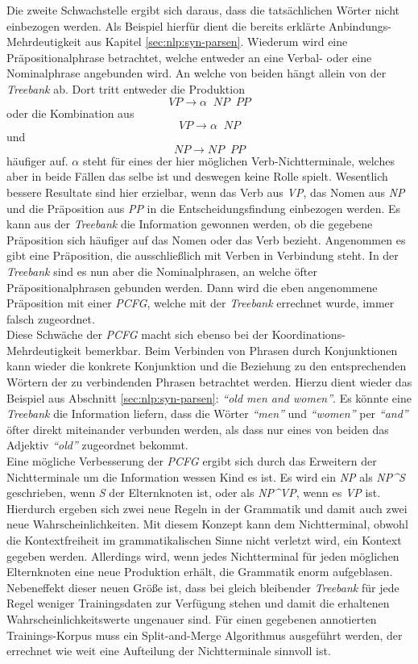 Die zweite Schwachstelle ergibt sich daraus, dass die tatsächlichen Wörter nicht einbezogen werden. Als Beispiel hierfür dient die bereits erklärte Anbindungs-Mehrdeutigkeit aus Kapitel \ref{sec:nlp:syn-parsen}. Wiederum wird eine Präpositionalphrase betrachtet, welche entweder an eine Verbal- oder eine Nominalphrase angebunden wird. An welche von beiden hängt allein von der \textit{Treebank} ab. Dort tritt entweder die Produktion \[ VP  \to  \alpha \;\;  NP \;\; PP \] oder die Kombination aus \[ VP  \to  \alpha \;\; NP \] und \[ NP  \to  NP \;\; PP \] häufiger auf. \( \alpha \) steht für eines der hier möglichen Verb-Nichtterminale, welches aber in beide Fällen das selbe ist und deswegen keine Rolle spielt. Wesentlich bessere Resultate sind hier erzielbar, wenn das Verb aus \textit{VP}, das Nomen aus \textit{NP} und die Präposition aus \textit{PP} in die Entscheidungsfindung einbezogen werden. Es kann aus der \textit{Treebank} die Information gewonnen werden, ob die gegebene Präposition sich häufiger auf das Nomen oder das Verb bezieht. Angenommen es gibt eine Präposition, die ausschließlich mit Verben in Verbindung steht. In der \textit{Treebank} sind es nun aber die Nominalphrasen, an welche öfter Präpositionalphrasen gebunden werden. Dann wird die eben angenommene Präposition mit einer \textit{PCFG}, welche mit der \textit{Treebank} errechnet wurde, immer falsch zugeordnet. \\ 
Diese Schwäche der \textit{PCFG} macht sich ebenso bei der Koordinations-Mehrdeutigkeit bemerkbar. Beim Verbinden von Phrasen durch Konjunktionen kann wieder die konkrete Konjunktion und die Beziehung zu den entsprechenden Wörtern der zu verbindenden Phrasen betrachtet werden. Hierzu dient wieder das Beispiel aus Abschnitt \ref{sec:nlp:syn-parsen}: \textit{``old men and women''}. Es könnte eine \textit{Treebank} die Information liefern, dass die Wörter \textit{``men''} und \textit{``women''} per \textit{``and''} öfter direkt miteinander verbunden werden, als dass nur eines von beiden das Adjektiv \textit{``old''} zugeordnet bekommt. \\
Eine mögliche Verbesserung der \textit{PCFG} ergibt sich durch das Erweitern der Nichtterminale um die Information wessen Kind es ist. Es wird ein \textit{NP} als \textit{NP\^{}S} geschrieben, wenn \textit{S} der Elternknoten ist, oder als \textit{NP\^{}VP}, wenn es \textit{VP} ist. Hierdurch ergeben sich zwei neue Regeln in der Grammatik und damit auch zwei neue Wahrscheinlichkeiten. Mit diesem Konzept kann dem Nichtterminal, obwohl die Kontextfreiheit im grammatikalischen Sinne nicht verletzt wird, ein Kontext gegeben werden. Allerdings wird, wenn jedes Nichtterminal für jeden möglichen Elternknoten eine neue Produktion erhält, die Grammatik enorm aufgeblasen. Nebeneffekt dieser neuen Größe ist, dass bei gleich bleibender \textit{Treebank} für jede Regel weniger Trainingsdaten zur Verfügung stehen und damit die erhaltenen Wahrscheinlichkeitswerte ungenauer sind. Für einen gegebenen annotierten Trainings-Korpus muss ein Split-and-Merge Algorithmus ausgeführt werden, der errechnet wie weit eine Aufteilung der Nichtterminale sinnvoll ist.

